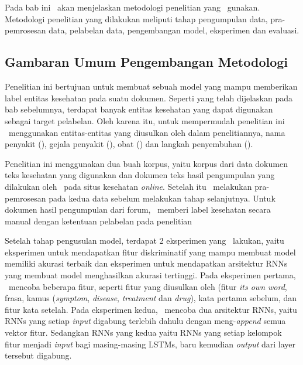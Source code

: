 \chapter{\babTiga}\label{bab:tiga}
Pada bab ini \saya~akan menjelaskan metodologi penelitian yang \saya~gunakan. Metodologi penelitian yang dilakukan meliputi tahap pengumpulan data, pra-pemrosesan data, pelabelan data, pengembangan model, eksperimen dan evaluasi.

\section{Gambaran Umum Pengembangan Metodologi}
Penelitian ini bertujuan untuk membuat sebuah model yang mampu memberikan label entitas kesehatan pada suatu dokumen. Seperti yang telah dijelaskan pada bab sebelumnya, terdapat banyak entitas kesehatan yang dapat digunakan sebagai target pelabelan. Oleh karena itu, untuk mempermudah penelitian ini \saya~menggunakan entitas-entitas yang diusulkan oleh \cite{skripsiKakRadit} dalam penelitiannya,  nama penyakit (\textit{\disease}), gejala penyakit (\textit{\symptom}), obat (\textit{\drug}) dan langkah penyembuhan (\textit{\treatment}).

Penelitian ini menggunakan dua buah korpus, yaitu korpus dari data dokumen teks kesehatan yang digunakan \cite{skripsiKakRadit} dan dokumen teks hasil pengumpulan yang dilakukan oleh \saya~pada situs kesehatan \textit{online}. Setelah itu \saya~melakukan pra-pemrosesan pada kedua data sebelum melakukan tahap selanjutnya. Untuk dokumen hasil pengumpulan dari forum, \saya~memberi label kesehatan secara manual dengan ketentuan pelabelan pada penelitian \cite{skripsiKakRadit}

Setelah tahap pengusulan model, terdapat 2 eksperimen yang \saya~lakukan, yaitu eksperimen untuk mendapatkan fitur diskriminatif yang mampu membuat model memiliki akurasi terbaik dan eksperimen untuk mendapatkan arsitektur RNNs yang membuat model menghasilkan akurasi tertinggi. Pada eksperimen pertama, \saya~mencoba beberapa fitur, seperti fitur yang diusulkan oleh \cite{skripsiKakRadit} (fitur \textit{its own word}, frasa, kamus (\textit{symptom}, \textit{disease}, \textit{treatment} dan \textit{drug}), kata pertama sebelum, dan fitur kata setelah. Pada eksperimen kedua, \saya~mencoba dua arsitektur RNNs, yaitu RNNs yang setiap \textit{input} digabung terlebih dahulu dengan meng-\textit{append} semua vektor fitur. Sedangkan RNNs yang kedua yaitu RNNs yang setiap kelompok fitur menjadi \textit{input} bagi masing-masing LSTMs, baru kemudian \textit{output} dari layer tersebut digabung.

